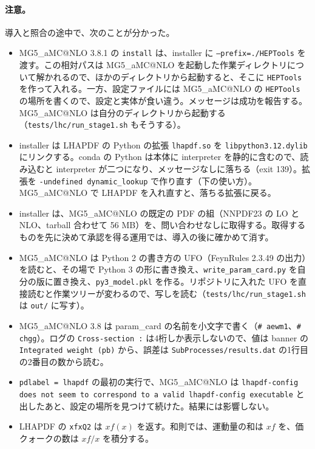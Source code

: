 \documentclass[a4paper,10pt]{ltjsarticle}
\makeatletter
\newcommand{\MGaMC}{MG5\_aMC@NLO}
\makeatother
\begin{document}
\paragraph{注意。}導入と照合の途中で、次のことが分かった。
\begin{itemize}
\item \MGaMC{} 3.8.1 の \texttt{install} は、installer に \texttt{--prefix=./HEPTools} を渡す。この相対パスは \MGaMC{} を起動した作業ディレクトリについて解かれるので、ほかのディレクトリから起動すると、そこに \texttt{HEPTools} を作って入れる。一方、設定ファイルには \MGaMC{} の \texttt{HEPTools} の場所を書くので、設定と実体が食い違う。メッセージは成功を報告する。\MGaMC{} は自分のディレクトリから起動する（\nolinkurl{tests/lhc/run_stage1.sh} もそうする）。
\item installer は LHAPDF の Python の拡張 \texttt{lhapdf.so} を \texttt{libpython3.12.dylib} にリンクする。conda の Python は本体に interpreter を静的に含むので、読み込むと interpreter が二つになり、メッセージなしに落ちる（exit 139）。拡張を \texttt{-undefined dynamic\_lookup} で作り直す（下の使い方）。\MGaMC{} で LHAPDF を入れ直すと、落ちる拡張に戻る。
\item installer は、\MGaMC{} の既定の PDF の組（NNPDF23 の LO と NLO、tarball 合わせて 56 MB）を、問い合わせなしに取得する。取得するものを先に決めて承認を得る運用では、導入の後に確かめて消す。
\item \MGaMC{} は Python 2 の書き方の UFO（FeynRules 2.3.49 の出力）を読むと、その場で Python 3 の形に書き換え、\texttt{write\_param\_card.py} を自分の版に置き換え、\texttt{py3\_model.pkl} を作る。リポジトリに入れた UFO を直接読むと作業ツリーが変わるので、写しを読む（\nolinkurl{tests/lhc/run_stage1.sh} は \texttt{out/} に写す）。
\item \MGaMC{} 3.8 は param\_card の名前を小文字で書く（\texttt{\# aewm1}、\texttt{\# chgg}）。ログの \texttt{Cross-section :} は4桁しか表示しないので、値は banner の \texttt{Integrated weight (pb)} から、誤差は \texttt{SubProcesses/results.dat} の1行目の2番目の数から読む。
\item \texttt{pdlabel = lhapdf} の最初の実行で、\MGaMC{} は \texttt{lhapdf-config does not seem to correspond to a valid lhapdf-config executable} と出したあと、設定の場所を見つけて続けた。結果には影響しない。
\item LHAPDF の \texttt{xfxQ2} は $xf(x)$ を返す。和則では、運動量の和は $xf$ を、価クォークの数は $xf/x$ を積分する。
\end{itemize}
\end{document}
